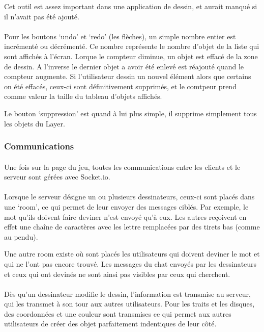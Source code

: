 \documentclass[11pt,a4paper]{article}
\begin{document}
                Cet outil est assez important dans une application de dessin,
                et aurait manqué si il n'avait pas été ajouté.
                \paragraph{}
                Pour les boutons `undo' et `redo' (les flèches), un simple nombre entier est incrémenté ou décrémenté.
                Ce nombre représente le nombre d'objet de la liste qui sont affichés à l'écran.
                Lorque le compteur diminue, un objet est effacé de la zone de dessin.
                A l'inverse le dernier objet a avoir été enlevé est réajouté quand le compteur augmente.
                Si l'utilisateur dessin un nouvel élément alors que certains on été effacés,
                ceux-ci sont définitivement supprimés,
                et le comtpeur prend comme valeur la taille du tableau d'objets affichés.

                Le bouton `suppression' est quand à lui plus simple, il supprime simplement tous les objets du Layer.
            \subsubsection{Communications}
                \paragraph{}
                Une fois sur la page du jeu, toutes les communications entre les clients et le serveur sont gérées avec Socket.io.
                \paragraph{}
                Lorsque le serveur désigne un ou plusieurs dessinateurs, ceux-ci sont placés dans une `room',
                ce qui permet de leur envoyer des messages ciblés.
                Par exemple, le mot qu'ils doivent faire deviner n'est envoyé qu'à eux.
                Les autres reçoivent en effet une chaîne de caractères avec les lettre remplacées par des tirets bas (comme au pendu).

                Une autre room existe où sont placés les utilisateurs qui doivent deviner le mot et qui ne l'ont pas encore trouvé.
                Les messages du chat envoyés par les dessinateurs et ceux qui ont devinés ne sont ainsi pas visibles par ceux qui cherchent.
                \paragraph{}
                Dès qu'un dessinateur modifie le dessin, l'information est transmise au serveur, qui les transmet à son tour aux autres utilisateurs.
                Pour les traits et les disques,
                des coordonnées et une couleur sont transmises ce qui permet aux autres utilisateurs de créer des objet parfaitement indentiques de leur côté.
\end{document}
